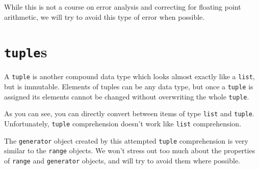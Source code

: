 \documentclass[m3380-lec-main.tex]{subfiles}
\begin{document}
\noindent
While this is not a course on error analysis and correcting for floating point arithmetic, we will try to avoid this type of error when possible. 

\section{\texttt{tuple}s}
A \verb|tuple| is another compound data type which looks almost exactly like a \verb|list|, but is immutable. Elements of tuples can be any data type, but once a \verb|tuple| is assigned its elements cannot be changed without overwriting the whole \verb|tuple|. 

\smallskip\noindent
As you can see, you can directly convert between items of type \verb|list| and \verb|tuple|. Unfortunately, \verb|tuple| comprehension doesn't work like \verb|list| comprehension.

\smallskip\noindent
The \verb|generator| object created by this attempted \verb|tuple| comprehension is very similar to the \verb|range| objects. We won't stress out too much about the properties of \verb|range| and \verb|generator| objects, and will try to avoid them where possible.
\end{document}
